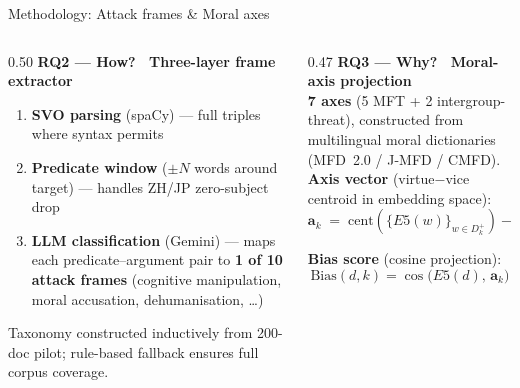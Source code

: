 \documentclass[aspectratio=169,10pt]{beamer}
\newcommand{\keyword}[1]{\textcolor{uzhblue}{\textbf{#1}}}
\begin{document}
\begin{frame}{Methodology: Attack frames \& Moral axes}
  \small
  \begin{columns}[T,onlytextwidth]

    \begin{column}{0.50\textwidth}
      \textbf{RQ2 — How? \ Three-layer frame extractor}

      \begin{enumerate}\itemsep2pt
        \item \textbf{SVO parsing} (spaCy) — full triples where
              syntax permits
        \item \textbf{Predicate window} (${\pm}N$ words around
              target) — handles ZH/JP zero-subject drop
        \item \textbf{LLM classification} (Gemini) — maps each
              predicate–argument pair to \keyword{1 of 10 attack frames}
              (cognitive manipulation, moral accusation,
              dehumanisation, \ldots)
      \end{enumerate}

      \vspace{0.4em}
      \textcolor{mutedgray}{Taxonomy constructed inductively from
      200-doc pilot; rule-based fallback ensures full corpus coverage.}
    \end{column}

    \begin{column}{0.47\textwidth}
      \textbf{RQ3 — Why? \ Moral-axis projection}\\[0.3em]

      \keyword{7 axes} (5 MFT + 2 intergroup-threat),
      constructed from multilingual moral dictionaries
      (MFD~2.0 / J-MFD / CMFD).\\[0.5em]

      \textbf{Axis vector} (virtue$-$vice centroid in embedding space):
      \[
        \mathbf{a}_k \;=\;
        \text{cent}\!\left(\{E5(w)\}_{w\in D_k^+}\right)
        -
        \text{cent}\!\left(\{E5(w)\}_{w\in D_k^-}\right)
      \]

      \textbf{Bias score} (cosine projection):
      \[
        \mathrm{Bias}(d,k)=\cos\!\bigl(E5(d),\,\mathbf{a}_k\bigr)
      \]


\end{column}
\end{columns}
\end{frame}
\end{document}
